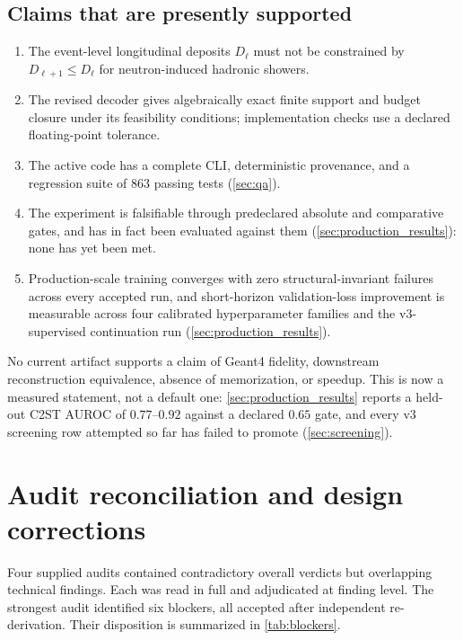 \documentclass[10pt,a4paper]{article}
\begin{document}
\subsection{Claims that are presently supported}
\label{sec:claims}
\begin{enumerate}
\item The event-level longitudinal deposits $D_\ell$ must not be constrained by $D_{\ell+1}\le D_\ell$ for neutron-induced hadronic showers.
\item The revised decoder gives algebraically exact finite support and budget closure under its feasibility conditions; implementation checks use a declared floating-point tolerance.
\item The active code has a complete CLI, deterministic provenance, and a regression suite of 863 passing tests (\cref{sec:qa}).
\item The experiment is falsifiable through predeclared absolute and comparative gates, and has in fact been evaluated against them (\cref{sec:production_results}): none has yet been met.
\item Production-scale training converges with zero structural-invariant failures across every accepted run, and short-horizon validation-loss improvement is measurable across four calibrated hyperparameter families and the v3-supervised continuation run (\cref{sec:production_results}).
\end{enumerate}

No current artifact supports a claim of Geant4 fidelity, downstream reconstruction equivalence, absence of memorization, or speedup. This is now a measured statement, not a default one: \cref{sec:production_results} reports a held-out C2ST AUROC of $0.77$--$0.92$ against a declared $0.65$ gate, and every v3 screening row attempted so far has failed to promote (\cref{sec:screening}).

\section{Audit reconciliation and design corrections}

Four supplied audits contained contradictory overall verdicts but overlapping technical findings. Each was read in full and adjudicated at finding level. The strongest audit identified six blockers, all accepted after independent re-derivation. Their disposition is summarized in \cref{tab:blockers}.
\end{document}
